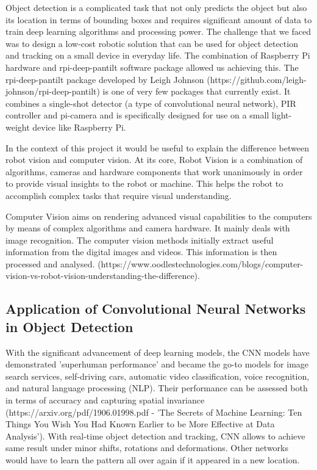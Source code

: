 \documentclass[runningheads]{llncs}
\begin{document}
Object detection is a complicated task that not only predicts the object but also its location in terms of bounding boxes and requires significant amount of data to train deep learning algorithms and processing power. The challenge that we faced was to design a low-cost robotic solution that can be used for object detection and tracking on a small device in everyday life. The combination of Raspberry Pi hardware and rpi-deep-pantilt software package allowed us achieving this. The rpi-deep-pantilt package developed by Leigh Johnson (https://github.com/leigh-johnson/rpi-deep-pantilt) is one of very few packages that currently exist. It combines a single-shot detector (a type of convolutional neural network), PIR controller and pi-camera  and is specifically designed for use on a small light-weight device like Raspberry Pi. 

In the context of this project it would be useful to explain the difference between robot vision and computer vision. At its core, Robot Vision is a combination of algorithms, cameras and hardware components that work unanimously in order to provide visual insights to the robot or machine. This helps the robot to accomplish complex tasks that require visual understanding.

Computer Vision aims on rendering advanced visual capabilities to the computers by means of complex algorithms and camera hardware. It mainly deals with image recognition. The computer vision methods initially extract useful information from the digital images and videos. This information is then processed and analysed. (https://www.oodlestechnologies.com/blogs/computer-vision-vs-robot-vision-understanding-the-difference).  

\subsection{Application of Convolutional Neural Networks in Object Detection} 

With the significant advancement of deep learning models, the CNN models have demonstrated 'superhuman performance' and became the go-to models for image search services, self-driving cars, automatic video classification, voice recognition, and natural language processing (NLP). Their performance can be assessed both in terms of accuracy and capturing spatial invariance  (https://arxiv.org/pdf/1906.01998.pdf - 'The Secrets of Machine Learning: Ten Things You Wish You Had Known Earlier to be More Effective at Data Analysis'). With real-time object detection and tracking, CNN allows to achieve same result under minor shifts, rotations and deformations. Other networks would have to learn the pattern all over again if it appeared in a new location.  		
\end{document}
